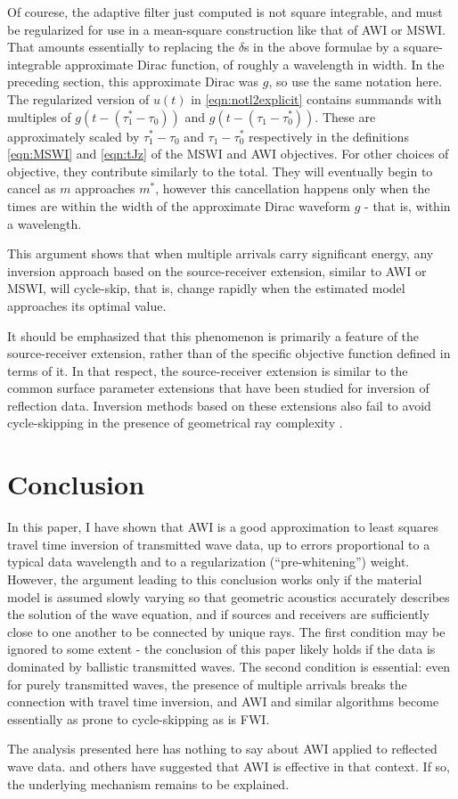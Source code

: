 Of courese, the adaptive filter just computed is not square
integrable, and must be regularized for use in a mean-square
construction like that of AWI or MSWI. That amounts essentially to
replacing the $\delta$s in the above formulae by a square-integrable
approximate Dirac function, of roughly a wavelength in width. In the
preceding section, this approximate Dirac was $g$, so use the same
notation here. The regularized version of $u(t)$ in
\ref{eqn:notl2explicit} contains summands with multiples of $g(t-(\tau^*_1-\tau_0))$
and $g(t-(\tau_1-\tau^*_0))$. These are approximately scaled by
$\tau^*_1-\tau_0$ and $\tau_1-\tau^*_0$ respectively in the
definitions \ref{eqn:MSWI} and \ref{eqn:tJz} of the MSWI and AWI
objectives. For other choices of objective, they contribute similarly
to the total. They will eventually begin to cancel as $m$ approaches
$m^*$, however this cancellation happens only when the times are
within the width of the approximate 
Dirac waveform $g$ - that is, within a wavelength.

This argument shows that when multiple arrivals carry significant energy, any
inversion approach based on the source-receiver extension, similar to
AWI or MSWI, will cycle-skip, that is, change rapidly when the
estimated model approaches its optimal value.

It should be emphasized that this phenomenon is primarily a feature of the
source-receiver extension, rather than of the specific objective
function defined in terms of it. In that respect, the source-receiver
extension is similar to the common surface parameter extensions that
have been studied for inversion of reflection data. Inversion methods
based on these extensions also fail to avoid cycle-skipping in the presence of
geometrical ray complexity \cite[]{geoprosp:2008}.

\section{Conclusion}
In this paper, I have shown that AWI is a good approximation to least
squares travel time inversion of transmitted wave data, up to errors proportional to a typical
data wavelength and to a regularization (``pre-whitening'')
weight. However, the argument leading to this conclusion works only if
the material model is assumed slowly varying so that geometric
acoustics accurately describes the solution of the wave equation, and if
sources and receivers are sufficiently close to one another to be
connected by unique rays. The first condition may be ignored to some
extent - the conclusion of this paper likely holds if the data is
dominated by ballistic transmitted waves. The second condition
is essential: even for purely transmitted waves, the presence of
multiple arrivals breaks the connection
with travel time inversion, and AWI and similar algorithms
become essentially as prone to cycle-skipping as is FWI.

The analysis presented here has nothing to say about AWI applied to
reflected wave data. \cite{Warner:16} and others have
suggested that AWI is effective in that context. If so, the underlying
mechanism remains to be explained. 





